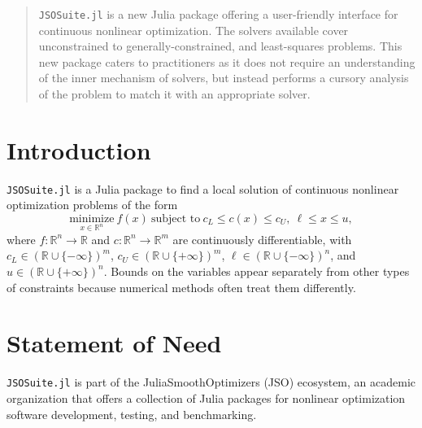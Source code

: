 \documentclass{juliacon}
\begin{document}


\maketitle

\begin{abstract}

\texttt{JSOSuite.jl} is a new Julia package offering a user-friendly interface for continuous nonlinear optimization.
The solvers available cover unconstrained to generally-constrained, and least-squares problems.
This new package caters to practitioners as it does not require an understanding of the inner mechanism of solvers, but instead performs a cursory analysis of the problem to match it with an appropriate solver.

\end{abstract}

\section{Introduction}

\texttt{JSOSuite.jl} is a Julia \cite{bezanson2017julia} package to find a local solution of continuous nonlinear optimization problems of the form
\begin{equation}\label{eq:nlp}
    \underset{x \in \mathbb{R}^{n}}{\text{minimize}} \ f(x) \ \text{subject to} \ c_L \leq c(x)  \leq c_U, \ \ell \leq x \leq u,
\end{equation}
where \(f:\mathbb{R}^n\to\mathbb{R}\) and  \(c:\mathbb{R}^n\to\mathbb{R}^m\) are continuously differentiable, with \(c_L \in \left(\mathbb{R} \cup \{-\infty\} \right)^{m}\),  \(c_U \in \left(\mathbb{R} \cup \{+\infty\} \right)^{m}\),  \(\ell \in \left(\mathbb{R} \cup \{-\infty\} \right)^n\), and  \(u \in \left(\mathbb{R} \cup \{+\infty\} \right)^n\).
Bounds on the variables appear separately from other types of constraints because numerical methods often treat them differently.

\section{Statement of Need}

\texttt{JSOSuite.jl} is part of the JuliaSmoothOptimizers (JSO) ecosystem, %
an academic organization that offers a collection of Julia packages for nonlinear optimization software development, testing, and benchmarking.
\end{document}
